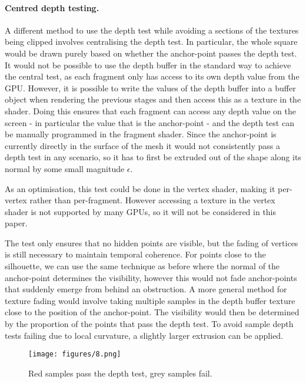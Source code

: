 \documentclass[a4paper,10pt]{article}
\begin{document}
\paragraph{Centred depth testing.}
A different method to use the depth test while avoiding a sections of the textures being clipped involves centralising the depth test. In particular, the whole square would be drawn purely based on whether the anchor-point passes the depth test. It would not be possible to use the depth buffer in the standard way to achieve the central test, as each fragment only has access to its own depth value from the GPU. However, it is possible to write the values of the depth buffer into a buffer object when rendering the previous stages and then access this as a texture in the shader. Doing this ensures that each fragment can access any depth value on the screen - in particular the value that is the anchor-point - and the depth test can be manually programmed in the fragment shader. Since the anchor-point is currently directly in the surface of the mesh it would not consistently pass a depth test in any scenario, so it has to first be extruded out of the shape along its normal by some small magnitude $\epsilon$.

\noindent
As an optimisation, this test could be done in the vertex shader, making it per-vertex rather than per-fragment. However accessing a texture in the vertex shader is not supported by many GPUs, so it will not be considered in this paper.

\noindent
The test only ensures that no hidden points are visible, but the fading of vertices is still necessary to maintain temporal coherence. For points close to the silhouette, we can use the same technique as before where the normal of the anchor-point determines the visibility, however this would not fade anchor-points that suddenly emerge from behind an obstruction. A more general method for texture fading would involve taking multiple samples in the depth buffer texture close to the position of the anchor-point. The visibility would then be determined by the proportion of the points that pass the depth test. To avoid sample depth tests failing due to local curvature, a slightly larger extrusion can be applied.

\begin{figure}[htbp!]
  \centering
  \texttt{[image: figures/8.png]}
  \caption{Red samples pass the depth test, grey samples fail.}
\end{figure}
\end{document}
